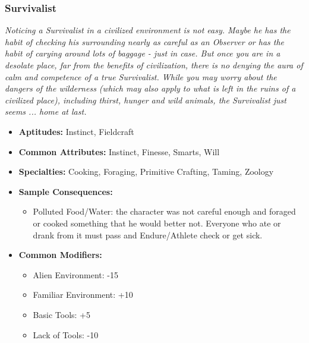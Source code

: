 \subsubsection{Survivalist}\label{Survivalist}
\textit{Noticing a Survivalist in a civilized environment is not easy.
Maybe he has the habit of checking his surrounding nearly as careful as an Observer or has the habit of carying around lots of baggage - just in case.
But once you are in a desolate place, far from the benefits of civilization, there is no denying the aura of calm and competence of a true Survivalist.
While you may worry about the dangers of the wilderness (which may also apply to what is left in the ruins of a civilized place), including thirst, hunger and wild animals, the Survivalist just seems ... home at last.}
\begin{itemize}
	\item \textbf{Aptitudes:} Instinct, Fieldcraft
	\item \textbf{Common Attributes:} Instinct, Finesse, Smarts, Will
	\item \textbf{Specialties:} Cooking, Foraging, Primitive Crafting, Taming, Zoology 	
	\item \textbf{Sample Consequences:} 
	\begin{itemize}
		\item Polluted Food/Water: the character was not careful enough and foraged or cooked something that he would better not. Everyone who ate or drank from it must pass and Endure/Athlete check or get sick.
	\end{itemize}
	\item \textbf{Common Modifiers:}
	\begin{itemize}
		\item Alien Environment: -15
		\item Familiar Environment: +10
		\item Basic Tools: +5
		\item Lack of Tools: -10
	\end{itemize}
\end{itemize}


